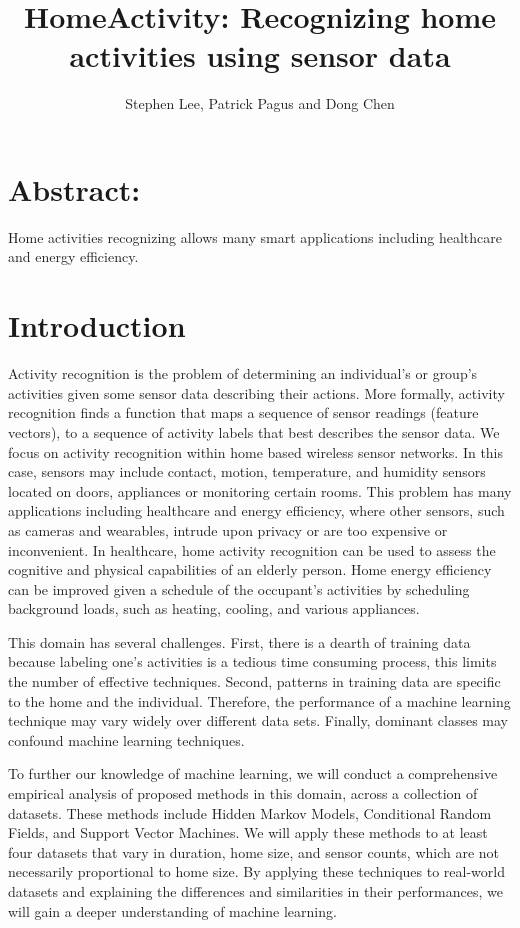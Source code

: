 \documentclass[11pt, oneside]{article}   	%
\title{HomeActivity: Recognizing home activities using sensor data}
\author{Stephen Lee, Patrick Pagus and Dong Chen}
\begin{document}
\maketitle
\section{Abstract:}
Home activities recognizing allows many smart applications including healthcare and energy efficiency. 

\section{Introduction}
Activity recognition is the problem of determining an individual's or group's activities given some sensor data describing their actions.
	More formally, activity recognition finds a function that maps a sequence of sensor readings (feature vectors), to a sequence of activity labels that best describes the sensor data.
	We focus on activity recognition within home based wireless sensor networks.
	In this case, sensors may include contact, motion, temperature, and humidity sensors located on doors, appliances or monitoring certain rooms.
	This problem has many applications including healthcare and energy efficiency, where other sensors, such as cameras and wearables, intrude upon privacy or are too expensive or inconvenient.
	In healthcare, home activity recognition can be used to assess the cognitive and physical capabilities of an elderly person.
	Home energy efficiency can be improved given a schedule of the occupant's activities by scheduling background loads, such as heating, cooling, and various appliances.

	This domain has several challenges.
	First, there is a dearth of training data because labeling one's activities is a tedious time consuming process, this limits the number of effective techniques.
	Second, patterns in training data are specific to the home and the individual.
	Therefore, the performance of a machine learning technique may vary widely over different data sets.
	Finally, dominant classes may confound machine learning techniques.

	To further our knowledge of machine learning, we will conduct a comprehensive empirical analysis of proposed methods in this domain, across a collection of datasets.
	These methods include Hidden Markov Models, Conditional Random Fields, and Support Vector Machines.
	We will apply these methods to at least four datasets that vary in duration, home size, and sensor counts, which are not necessarily proportional to home size.
	By applying these techniques to real-world datasets and explaining the differences and similarities in their performances, we will gain a deeper understanding of machine learning.
\end{document}
